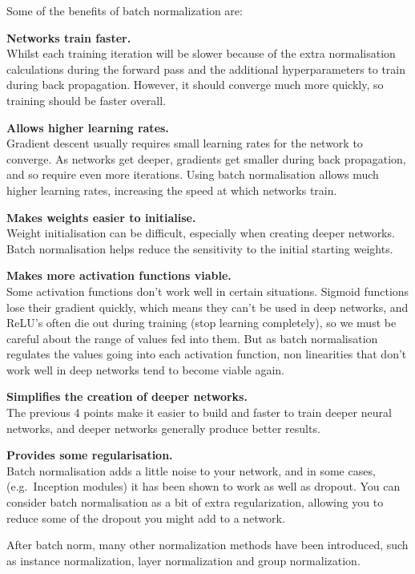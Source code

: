 
Some of the benefits of batch normalization are:
\bit
\item \textbf{Networks train faster.} \\ Whilst each training iteration will be slower because of the extra 
normalisation calculations during the forward pass and the additional hyperparameters to train during back 
propagation. However, it should converge much more quickly, so training should be faster overall.
\item \textbf{Allows higher learning rates.} \\ Gradient descent usually requires small learning rates for the 
network to converge. As networks get deeper, gradients get smaller during back propagation, and so require even more 
iterations. Using batch normalisation allows much higher learning rates, increasing the speed at which networks train.
\item \textbf{Makes weights easier to initialise.} \\ Weight initialisation can be difficult, especially when 
creating deeper networks. Batch normalisation helps reduce the sensitivity to the initial starting weights.
\item \textbf{Makes more activation functions viable.} \\ Some activation functions don't work well in certain 
situations. Sigmoid functions lose their gradient quickly, which means they can't be used in deep networks, and 
ReLU's often die out during training (stop learning completely), so we must be careful about the range of values fed 
into them. But as batch normalisation regulates the values going into each activation function, non linearities that 
don't work well in deep networks tend to become viable again.
\item \textbf{Simplifies the creation of deeper networks.} \\ The previous 4 points make it easier to build and 
faster to train deeper neural networks, and deeper networks generally produce better results.
\item \textbf{Provides some regularisation.} \\ Batch normalisation adds a little noise to your network, and in some 
cases, (e.g.\ Inception modules) it has been shown to work as well as dropout. You can consider batch normalisation as
a bit of extra regularization, allowing you to reduce some of the dropout you might add to a network. 
\eit

After batch norm, many other normalization methods have been introduced, such as instance normalization, layer 
normalization and group normalization.
